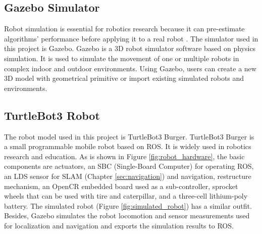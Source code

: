 \subsection{Gazebo Simulator}
Robot simulation is essential for robotics research because it can pre-estimate algorithms' performance before applying it to a real robot \cite{Afanasyev2015}. 
The simulator used in this project is Gazebo. Gazebo\cite{GZ} is a 3D robot simulator software based on physics simulation. It is used to simulate the movement of one or multiple robots in complex indoor and outdoor environments.
Using Gazebo, users can create a new 3D model with geometrical primitive or import existing simulated robots and environments. 

\subsection{TurtleBot3 Robot}
The robot model used in this project is TurtleBot3 Burger. TurtleBot3 Burger is a small programmable mobile robot based on ROS. It is widely used in robotics research and education.
As is shown in Figure \ref{fig:robot_hardware}, the basic components are actuators, an SBC (Single-Board Computer) for operating ROS, an LDS sensor for SLAM (Chapter \ref{sec:navigation}) and navigation, restructure mechanism, an OpenCR embedded board used as a sub-controller, sprocket wheels that can be used with tire and caterpillar, and a three-cell lithium-poly battery.
The simulated robot (Figure \ref{fig:simulated_robot}) has a similar outfit. Besides, Gazebo simulates the robot locomotion and sensor measurements used for localization and navigation and exports the simulation results to ROS.


